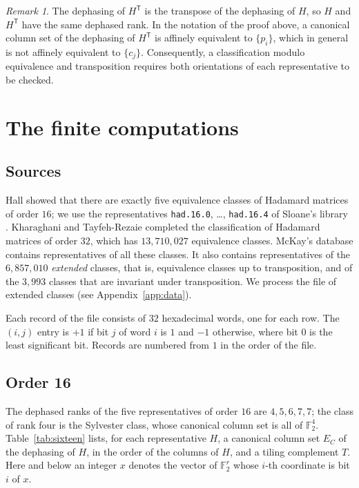 \documentclass[11pt]{amsart}
\theoremstyle{definition}
\theoremstyle{remark}
\newtheorem{remark}[theorem]{Remark}
\numberwithin{equation}{section}
\numberwithin{table}{section}
\newcommand{\F}{\mathbb{F}}
\newcommand{\T}{\mathsf{T}}
\begin{document}
\begin{remark}\label{rem:transpose}
The dephasing of $H^{\T}$ is the transpose of the dephasing of $H$, so $H$ and $H^{\T}$ have the same dephased rank. In the notation of the proof above, a canonical column set of the dephasing of $H^{\T}$ is affinely equivalent to $\{p_i\}$, which in general is not affinely equivalent to $\{c_j\}$. Consequently, a classification modulo equivalence and transposition requires both orientations of each representative to be checked.
\end{remark}

\section{The finite computations}\label{sec:computation}

\subsection{Sources}
Hall \cite{Hal61} showed that there are exactly five equivalence classes of Hadamard matrices of order $16$; we use the representatives \texttt{had.16.0}, \dots, \texttt{had.16.4} of Sloane's library \cite{Slo}. Kharaghani and Tayfeh-Rezaie \cite{KT13} completed the classification of Hadamard matrices of order $32$, which has $13{,}710{,}027$ equivalence classes. McKay's database \cite{McK} contains representatives of all these classes. It also contains representatives of the $6{,}857{,}010$ \emph{extended} classes, that is, equivalence classes up to transposition, and of the $3{,}993$ classes that are invariant under transposition. We process the file of extended classes (see Appendix~\ref{app:data}).

Each record of the file consists of $32$ hexadecimal words, one for each row. The $(i,j)$ entry is $+1$ if bit $j$ of word $i$ is $1$ and $-1$ otherwise, where bit $0$ is the least significant bit. Records are numbered from $1$ in the order of the file.

\subsection{Order 16}
The dephased ranks of the five representatives of order $16$ are $4,5,6,7,7$; the class of rank four is the Sylvester class, whose canonical column set is all of $\F_2^4$. Table~\ref{tab:sixteen} lists, for each representative $H$, a canonical column set $E_C$ of the dephasing of $H$, in the order of the columns of $H$, and a tiling complement $T$. Here and below an integer $x$ denotes the vector of $\F_2^r$ whose $i$-th coordinate is bit $i$ of $x$.
\end{document}
